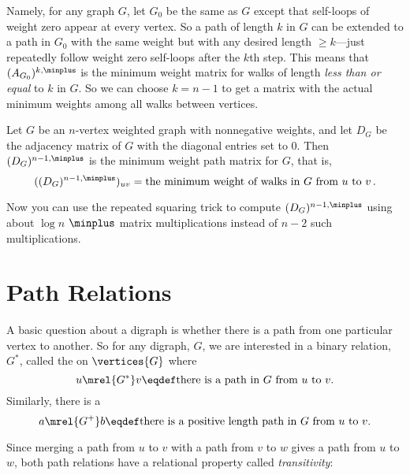 Namely, for any graph $G$, let $G_0$ be the same as $G$ except that
self-loops of weight zero appear at every vertex.  So a path of length $k$
in $G$ can be extended to a path in $G_0$ with the same weight but with
any desired length $ \geq k$---just repeatedly follow weight zero
self-loops after the $k$th step.  This means that $(A_{G_0})^{k, \minplus}$
is the minimum weight matrix for walks of length \emph{less than or equal}
to $k$ in $G$.  So we can choose $k = n-1$ to get a matrix with the
actual minimum weights among all walks between vertices.

\begin{theorem}\label{thm:minweightmatrix}
Let $G$ be an $n$-vertex weighted graph with nonnegative weights, and let
$D_G$ be the adjacency matrix of $G$ with the diagonal entries set to 0.
Then $(D_G)^{n-1, \minplus}$ is the minimum weight path matrix for $G$, that
is,
\[
((D_G)^{n-1, \minplus})_{uv} = \text{the minimum weight of walks in $G$ from
 $u$ to $v$}\,.
\]
\end{theorem}
Now you can use the repeated squaring trick to compute $(D_G)^{n-1,
  \minplus}$ using about $\log n$ $\minplus$ matrix multiplications
instead of $n-2$ such multiplications.

\begin{editingnotes}
\end{editingnotes}

\fi

\section{Path Relations}
A basic question about a digraph is whether there is a path from one
particular vertex to another.  So for any digraph, $G$, we are
interested in a binary relation, $G^*$, called the  on $\vertices{G}$ where
\begin{equation}\label{G*def}
u \mrel{G^*} v \eqdef \mbox{there is a path in $G$ from $u$ to $v$}.
\end{equation}
Similarly, there is a 
\begin{equation}\label{G+def}
a \mrel{G^+} b \eqdef \mbox{there is a positive length path in $G$ from $u$ to $v$}.
\end{equation}

Since merging a path from $u$ to $v$ with a path from $v$ to $w$ gives
a path from $u$ to $w$, both path relations have a relational property
called \emph{transitivity}:


